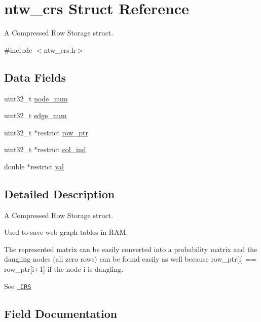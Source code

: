 \hypertarget{structntw__crs}{}\section{ntw\+\_\+crs Struct Reference}
\label{structntw__crs}


A Compressed Row Storage struct.  




{\ttfamily \#include $<$ntw\+\_\+crs.\+h$>$}

\subsection*{Data Fields}
\begin{DoxyCompactItemize}
\item 
uint32\+\_\+t \mbox{\hyperlink{structntw__crs_a36a11fbae59bf6159e40cb18e5f37ada}{node\+\_\+num}}
\item 
uint32\+\_\+t \mbox{\hyperlink{structntw__crs_a85160ebade6d93ba77c9e90f2f237cea}{edge\+\_\+num}}
\item 
uint32\+\_\+t $\ast$restrict \mbox{\hyperlink{structntw__crs_abf117885ca226f2a82ff28dca7177c34}{row\+\_\+ptr}}
\item 
uint32\+\_\+t $\ast$restrict \mbox{\hyperlink{structntw__crs_a3f5430e0836427a7da3b0bcceb3cc148}{col\+\_\+ind}}
\item 
double $\ast$restrict \mbox{\hyperlink{structntw__crs_a5ed2cc918a69051b395e9b151a66867f}{val}}
\end{DoxyCompactItemize}


\subsection{Detailed Description}
A Compressed Row Storage struct. 

Used to save web graph tables in R\+AM.

The represented matrix can be easily converted into a probability matrix and the dangling nodes (all zero rows) can be found easily as well because row\+\_\+ptr\mbox{[}i\mbox{]} == row\+\_\+ptr\mbox{[}i+1\mbox{]} if the node i is dangling.

See \href{http://netlib.org/linalg/html_templates/node91.html#SECTION00931100000000000000}\texttt{ C\+RS} 

\subsection{Field Documentation}
\mbox{\label{structntw__crs_a3f5430e0836427a7da3b0bcceb3cc148}} 
